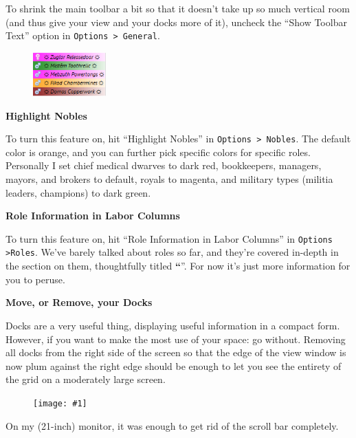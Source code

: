 \documentclass[]{article}
\newcommand{\jump}[1] {\textbf{``\nameref{sec:#1}}''}
\newcommand{\fullfigure}[1] {
\begin{figure}[h!]
\texttt{[image: \#1]}
\end{figure}
}
\newcommand{\fullfigurecaption}[1] {
\begin{center}
\vspace{-12pt}
#1
\end{center}
}
\begin{document}
To shrink the main toolbar a bit so that it doesn't take up so much vertical room (and thus give your
view and your docks more of it), uncheck the ``Show Toolbar Text'' option in \texttt{Options > General}.
\vspace{12pt}

\begin{figure}\vspace{-20pt}
  \begin{center}
    \includegraphics[width=0.25\textwidth]{Sec2Fig25}
  \end{center}
\vspace{-15pt}
\end{figure}
\noindent \textbf{Highlight Nobles}

To turn this feature on, hit ``Highlight Nobles'' in \texttt{Options > Nobles}. The default color is
orange, and you can further pick specific colors for specific roles. Personally I set chief medical
dwarves to dark red, bookkeepers, managers, mayors, and brokers to default, royals to magenta, and
military types (militia leaders, champions) to dark green.
\vspace{12pt}

\noindent \textbf{Role Information in Labor Columns}

To turn this feature on, hit ``Role Information in Labor Columns'' in \texttt{Options >Roles}. We've barely
talked about roles so far, and they're covered in-depth in the section on them, thoughtfully titled
\jump{Roles}. For now it's just more information for you to peruse.\
\vspace{12pt}

\noindent \textbf{Move, or Remove, your Docks}

Docks are a very useful thing, displaying useful information in a compact form. However, if you want to
make the most use of your space: go without. Removing all docks from the right side of the screen so that
the edge of the view window is now plum against the right edge should be enough to let you see the
entirety of the grid on a moderately large screen.

\fullfigure{Sec2Fig26}
\fullfigurecaption{On my (21-inch) monitor, it was enough to get rid of the scroll bar completely.}
\end{document}

